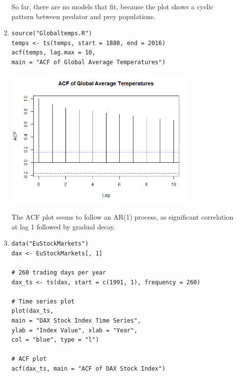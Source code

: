 \documentclass[12pt]{article}
\begin{document}
\begin{enumerate}
\begin{enumerate}
\begin{center}
    \end{center}
    So far, there are no models that fit, because the plot shows a cyclic pattern between
    predator and prey populations. 
    \item
\begin{verbatim}
source("Globaltemps.R")
temps <- ts(temps, start = 1880, end = 2016)
acf(temps, lag.max = 10, 
main = "ACF of Global Average Temperatures")
\end{verbatim}
    \begin{center}
        \includegraphics[width=0.8\textwidth]{Rplot02.png}
    \end{center}
    The ACF plot seems to follow an AR(1) process,
    as significant correlation at lag 1 followed by gradual decay.
    \item 
    \begin{verbatim}
data("EuStockMarkets")
dax <- EuStockMarkets[, 1]

# 260 trading days per year
dax_ts <- ts(dax, start = c(1991, 1), frequency = 260)

# Time series plot
plot(dax_ts, 
main = "DAX Stock Index Time Series", 
ylab = "Index Value", xlab = "Year", 
col = "blue", type = "l")

# ACF plot
acf(dax_ts, main = "ACF of DAX Stock Index")


\end{verbatim}
\end{enumerate}
\end{enumerate}
\end{document}
